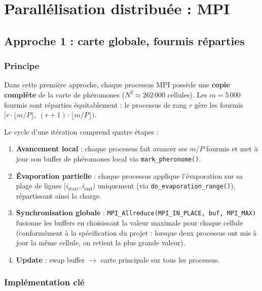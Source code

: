 \chapter{Parallélisation distribuée : MPI}
\label{chap:mpi}

\section{Approche 1 : carte globale, fourmis réparties}

\subsection{Principe}

Dans cette première approche, chaque processus MPI possède une \textbf{copie complète}
de la carte de phéromones ($N^2 \approx 262\,000$ cellules). Les $m = 5\,000$ fourmis
sont réparties équitablement : le processus de rang $r$ gère les fourmis
$[r \cdot \lfloor m/P \rfloor,\ (r+1) \cdot \lfloor m/P \rfloor)$.

Le cycle d'une itération comprend quatre étapes :

\begin{enumerate}
    \item \textbf{Avancement local} : chaque processus fait avancer ses $m/P$ fourmis
          et met à jour son buffer de phéromones local via \texttt{mark\_pheronome()}.
    \item \textbf{Évaporation partielle} : chaque processus applique l'évaporation
          sur sa plage de lignes $[i_{\text{start}}, i_{\text{end}})$ uniquement
          (via \texttt{do\_evaporation\_range()}), répartissant ainsi la charge.
    \item \textbf{Synchronisation globale} : \texttt{MPI\_Allreduce(MPI\_IN\_PLACE,
          buf, MPI\_MAX)} fusionne les buffers en choisissant la valeur maximale
          pour chaque cellule (conformément à la spécification du projet : lorsque
          deux processus ont mis à jour la même cellule, on retient la plus grande valeur).
    \item \textbf{Update} : swap buffer $\to$ carte principale sur tous les processus.
\end{enumerate}

\subsection{Implémentation clé}

